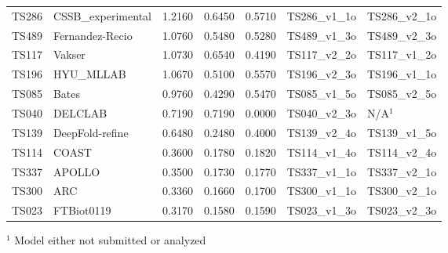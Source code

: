 \begin{table}[ht]
{\begin{tabular}{llrrrll}
TS286 & CSSB\_experimental & 1.2160 & 0.6450 & 0.5710 & TS286\_v1\_1o & TS286\_v2\_1o \\ 
TS489 & Fernandez-Recio & 1.0760 & 0.5480 & 0.5280 & TS489\_v1\_3o & TS489\_v2\_3o \\ 
TS117 & Vakser & 1.0730 & 0.6540 & 0.4190 & TS117\_v2\_2o & TS117\_v1\_2o \\ 
TS196 & HYU\_MLLAB & 1.0670 & 0.5100 & 0.5570 & TS196\_v2\_3o & TS196\_v1\_1o \\ 
TS085 & Bates & 0.9760 & 0.4290 & 0.5470 & TS085\_v1\_5o & TS085\_v2\_5o \\ 
TS040 & DELCLAB & 0.7190 & 0.7190 & 0.0000 & TS040\_v2\_3o & N/A$^{1}$ \\ 
TS139 & DeepFold-refine & 0.6480 & 0.2480 & 0.4000 & TS139\_v2\_4o & TS139\_v1\_5o \\ 
TS114 & COAST & 0.3600 & 0.1780 & 0.1820 & TS114\_v1\_4o & TS114\_v2\_4o \\ 
TS337 & APOLLO & 0.3500 & 0.1730 & 0.1770 & TS337\_v1\_1o & TS337\_v2\_1o \\ 
TS300 & ARC & 0.3360 & 0.1660 & 0.1700 & TS300\_v1\_1o & TS300\_v2\_1o \\ 
TS023 & FTBiot0119 & 0.3170 & 0.1580 & 0.1590 & TS023\_v1\_3o & TS023\_v2\_3o \\ 
\bottomrule
\end{tabular}%
}
\begin{flushleft}\footnotesize $^{1}$ Model either not submitted or analyzed\end{flushleft}
\end{table}
